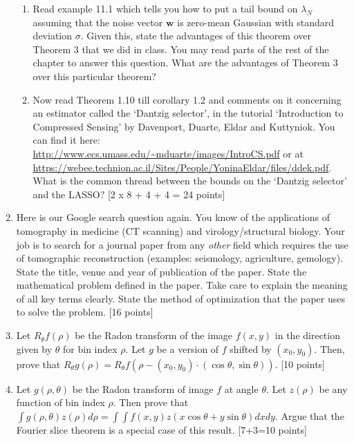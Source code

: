 \documentclass[11pt]{article}
\begin{document}
\begin{enumerate}
\begin{enumerate}
\item Read example 11.1 which tells you how to put a tail bound on $\lambda_N$ assuming that the noise vector $\boldsymbol{w}$ is zero-mean Gaussian with standard  deviation $\sigma$. Given this, state the advantages of this theorem over Theorem 3 that we did in class. You may read parts of the rest of the chapter to answer this question. What are the advantages of Theorem 3 over this particular theorem? 
\item Now read Theorem 1.10 till corollary 1.2 and comments on it concerning an estimator called the `Dantzig selector', in the tutorial `Introduction to Compressed Sensing' by Davenport, Duarte, Eldar and Kuttyniok. You can find it here: \url{http://www.ecs.umass.edu/~mduarte/images/IntroCS.pdf} or at \url{https://webee.technion.ac.il/Sites/People/YoninaEldar/files/ddek.pdf}. What is the common thread between the bounds on the `Dantzig selector' and the LASSO? 
\textsf{[2 x 8 + 4 + 4 = 24 points]}
\end{enumerate}

\item Here is our Google search question again. You know of the applications of tomography in medicine (CT scanning) and virology/structural biology. Your job is to search for a journal paper from any \emph{other} field which requires the use of tomographic reconstruction (examples: seismology, agriculture, gemology). State the title, venue and year of publication of the paper. State the mathematical problem defined in the paper. Take care to explain the meaning of all key terms clearly. State the method of optimization that the paper uses to solve the problem. \textsf{[16 points]}

\item Let $R_{\theta}f(\rho)$ be the Radon transform of the image $f(x,y)$ in the direction given by $\theta$ for bin index $\rho$. Let $g$ be a version of $f$ shifted by $(x_0,y_0)$. Then, prove that $R_{\theta}g(\rho) = R_{\theta}f(\rho - (x_0,y_0) \cdot (\cos \theta, \sin \theta))$. \textsf{[10 points]}

\item Let $g(\rho,\theta)$ be the Radon transform of image $f$ at angle $\theta$. Let $z(\rho)$ be any function of bin index $\rho$. Then prove that $\int g(\rho,\theta) z(\rho) d\rho = \int \int f(x,y) z(x \cos \theta + y \sin \theta) dx dy$. Argue that the Fourier slice theorem is a special case of this result. \textsf{[7+3=10 points]}


\end{enumerate}
\end{document}
